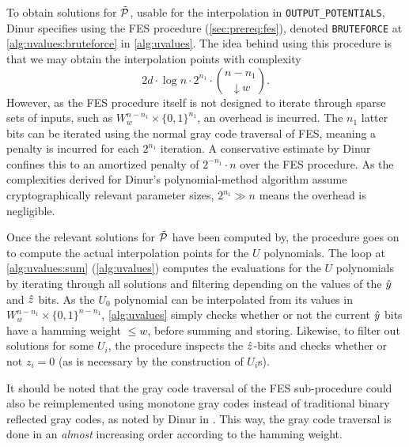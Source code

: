To obtain solutions for $\Tilde{\mathcal{P}}$, usable for the interpolation in \texttt{OUTPUT\_POTENTIALS}, Dinur specifies using the FES procedure (\cref{sec:prereq:fes}), denoted \texttt{BRUTEFORCE} at \cref{alg:uvalues:bruteforce} in \cref{alg:uvalues}. The idea behind using this procedure is that we may obtain the interpolation points with complexity 
$$
    2d \cdot \log n \cdot 2^{n_1} \cdot \binom{n - n_1}{\downarrow w}.
$$
However, as the FES procedure itself is not designed to iterate through sparse sets of inputs, such as $W^{n - n_1}_w \times \{0, 1\}^{n_1}$, an overhead is incurred. The $n_1$ latter bits can be iterated using the normal gray code traversal of FES, meaning a penalty is incurred for each $2^{n_1}$ iteration. A conservative estimate by Dinur confines this to an amortized penalty of $2^{- n_1} \cdot n$ over the FES procedure. As the complexities derived for Dinur's polynomial-method algorithm assume cryptographically relevant parameter sizes, $2^{n_1} \gg n$ means the overhead is negligible.

Once the relevant solutions for $\Tilde{\mathcal{P}}$ have been computed by, the procedure goes on to compute the actual interpolation points for the $U$ polynomials. The loop at \cref{alg:uvalues:sum} (\cref{alg:uvalues}) computes the evaluations for the $U$ polynomials by iterating through all solutions and filtering depending on the values of the $\Hat{y}$ and $\Hat{z}$ bits. As the $U_0$ polynomial can be interpolated from its values in $W^{n - n_1}_w \times \{0, 1\}^{n - n_1}$, \cref{alg:uvalues} simply checks whether or not the current $\Hat{y}$ bits have a hamming weight $\leq w$, before summing and storing. Likewise, to filter out solutions for some $U_i$, the procedure inspects the $\Hat{z}$-bits and checks whether or not $z_i = 0$ (as is necessary by the construction of $U_i$s).

It should be noted that the gray code traversal of the FES sub-procedure could also be reimplemented using monotone gray codes instead of traditional binary reflected gray codes, as noted by Dinur in \cite{cryptoeprint:2021/578}. This way, the gray code traversal is done in an \textit{almost} increasing order according to the hamming weight.

